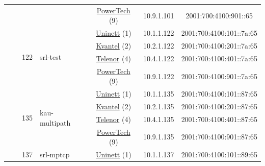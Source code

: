 \begin{small}
\begin{center}
\begin{longtable}{|c|c|c|c|c|c|c|c|}
  &  & \multicolumn{2}{|c|}{} & \multicolumn{2}{|c|}{\tiny{\href{http://www.powertech.no}{PowerTech} (9)}} & \tiny{10.9.1.101} & \tiny{2001:700:4100:901::65} \\* \cline{3-3}\cline{4-4}\cline{5-5}\cline{6-6}\cline{7-7}\cline{8-8}
  &  & \multirow{4}{*}{\tiny{122}} & \multicolumn{1}{|l|}{\multirow{4}{*}{\tiny{srl-test}}} & \multicolumn{2}{|c|}{\tiny{\href{https://www.uninett.no}{Uninett} (1)}} & \tiny{10.1.1.122} & \tiny{2001:700:4100:101::7a:65} \\* \cline{5-5}\cline{6-6}\cline{7-7}\cline{8-8}
  &  &  &  & \multicolumn{2}{|c|}{\tiny{\href{http://kvantel.no}{Kvantel} (2)}} & \tiny{10.2.1.122} & \tiny{2001:700:4100:201::7a:65} \\* \cline{5-5}\cline{6-6}\cline{7-7}\cline{8-8}
  &  &  &  & \multicolumn{2}{|c|}{\tiny{\href{https://www.telenor.no}{Telenor} (4)}} & \tiny{10.4.1.122} & \tiny{2001:700:4100:401::7a:65} \\* \cline{5-5}\cline{6-6}\cline{7-7}\cline{8-8}
  &  &  &  & \multicolumn{2}{|c|}{\tiny{\href{http://www.powertech.no}{PowerTech} (9)}} & \tiny{10.9.1.122} & \tiny{2001:700:4100:901::7a:65} \\* \cline{3-3}\cline{4-4}\cline{5-5}\cline{6-6}\cline{7-7}\cline{8-8}
  &  & \multirow{4}{*}{\tiny{135}} & \multicolumn{1}{|l|}{\multirow{4}{*}{\tiny{kau-multipath}}} & \multicolumn{2}{|c|}{\tiny{\href{https://www.uninett.no}{Uninett} (1)}} & \tiny{10.1.1.135} & \tiny{2001:700:4100:101::87:65} \\* \cline{5-5}\cline{6-6}\cline{7-7}\cline{8-8}
  &  &  &  & \multicolumn{2}{|c|}{\tiny{\href{http://kvantel.no}{Kvantel} (2)}} & \tiny{10.2.1.135} & \tiny{2001:700:4100:201::87:65} \\* \cline{5-5}\cline{6-6}\cline{7-7}\cline{8-8}
  &  &  &  & \multicolumn{2}{|c|}{\tiny{\href{https://www.telenor.no}{Telenor} (4)}} & \tiny{10.4.1.135} & \tiny{2001:700:4100:401::87:65} \\* \cline{5-5}\cline{6-6}\cline{7-7}\cline{8-8}
  &  &  &  & \multicolumn{2}{|c|}{\tiny{\href{http://www.powertech.no}{PowerTech} (9)}} & \tiny{10.9.1.135} & \tiny{2001:700:4100:901::87:65} \\* \cline{3-3}\cline{4-4}\cline{5-5}\cline{6-6}\cline{7-7}\cline{8-8}
  &  & \multirow{4}{*}{\tiny{137}} & \multicolumn{1}{|l|}{\multirow{4}{*}{\tiny{srl-mptcp}}} & \multicolumn{2}{|c|}{\tiny{\href{https://www.uninett.no}{Uninett} (1)}} & \tiny{10.1.1.137} & \tiny{2001:700:4100:101::89:65} \\* \cline{5-5}\cline{6-6}\cline{7-7}\cline{8-8}

\end{longtable}
\end{center}
\end{small}
